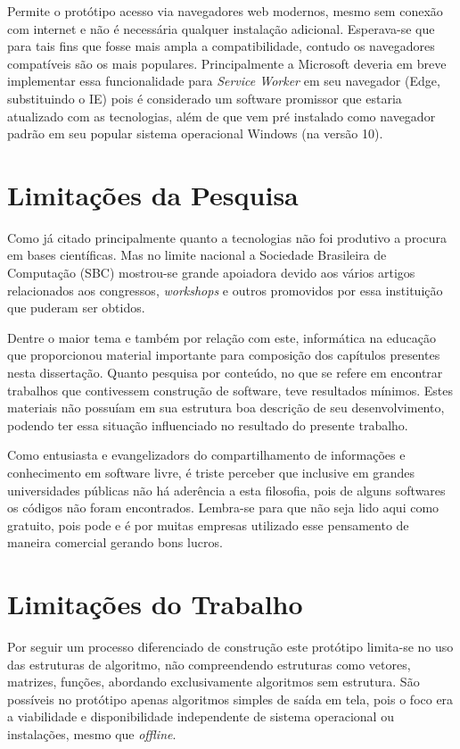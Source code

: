 Permite o protótipo acesso via navegadores web modernos, mesmo sem conexão com internet e não é necessária qualquer instalação adicional. Esperava-se que para tais fins que fosse mais ampla a compatibilidade, contudo os navegadores compatíveis são os mais populares. Principalmente a Microsoft deveria em breve implementar essa funcionalidade para \textit{Service Worker} em seu navegador (Edge, substituindo o IE) pois é considerado um software promissor que estaria atualizado com as tecnologias, além de que vem pré instalado como navegador padrão em seu popular sistema operacional Windows (na versão 10).

\section{Limitações da Pesquisa}

Como já citado principalmente quanto a tecnologias não foi produtivo a procura em bases científicas. Mas no limite nacional a Sociedade Brasileira de Computação (SBC) mostrou-se grande apoiadora devido aos vários artigos relacionados aos congressos, \textit{workshops} e outros promovidos por essa instituição que puderam ser obtidos.

Dentre o maior tema e também por relação com este, informática na educação que proporcionou material importante para composição dos capítulos presentes nesta dissertação. Quanto pesquisa por conteúdo, no que se refere em encontrar trabalhos que contivessem construção de software, teve resultados mínimos. Estes materiais não possuíam em sua estrutura boa descrição de seu desenvolvimento, podendo ter essa situação influenciado no resultado do presente trabalho.

Como entusiasta e evangelizadors do compartilhamento de informações e conhecimento em software livre, é triste perceber que inclusive em grandes universidades públicas não há aderência a esta filosofia, pois de alguns softwares os códigos não foram encontrados. Lembra-se para que não seja lido aqui como gratuito, pois pode e é por muitas empresas utilizado esse pensamento de maneira comercial gerando bons lucros.

\section{Limitações do Trabalho}

Por seguir um processo diferenciado de construção este protótipo limita-se no uso das estruturas de algoritmo, não compreendendo estruturas como vetores, matrizes, funções, abordando exclusivamente algoritmos sem estrutura. São possíveis no protótipo apenas algoritmos simples de saída em tela, pois o foco era a viabilidade e disponibilidade independente de sistema operacional ou instalações, mesmo que \textit{offline}.

